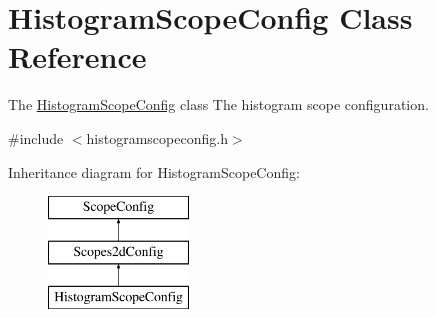 \hypertarget{class_histogram_scope_config}{\section{\-Histogram\-Scope\-Config \-Class \-Reference}
\label{class_histogram_scope_config}
}


\-The \hyperlink{class_histogram_scope_config}{\-Histogram\-Scope\-Config} class \-The histogram scope configuration.  




{\ttfamily \#include $<$histogramscopeconfig.\-h$>$}

\-Inheritance diagram for \-Histogram\-Scope\-Config\-:\begin{figure}[H]
\begin{center}
\leavevmode
\includegraphics[height=3.000000cm]{class_histogram_scope_config}
\end{center}
\end{figure}
